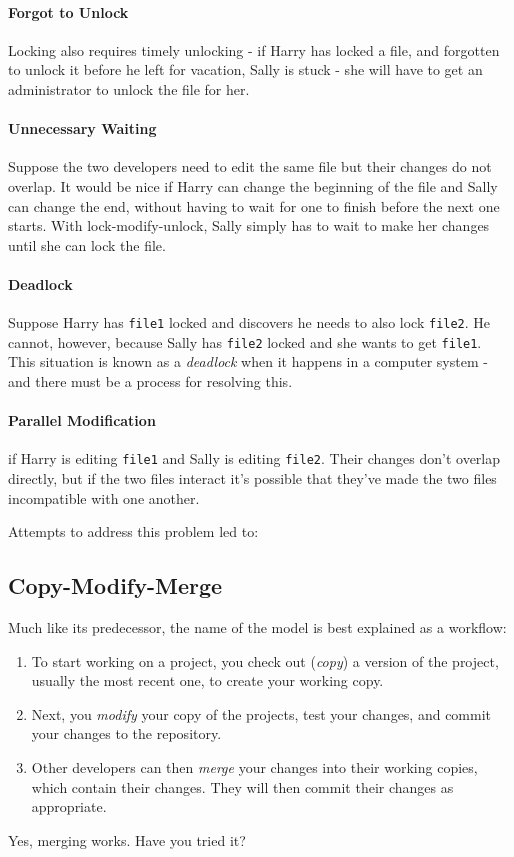\paragraph{Forgot to Unlock} Locking also requires timely unlocking - if Harry has locked a file, and forgotten to unlock it before he left for vacation, Sally is stuck - she will have to get an administrator to unlock the file for her.

\paragraph{Unnecessary Waiting} Suppose the two developers need to edit the same file but their changes do not overlap. It would be nice if Harry can change the beginning of the file and Sally can change the end, without having to wait for one to finish before the next one starts. With lock-modify-unlock, Sally simply has to wait to make her changes until she can lock the file.

\paragraph{Deadlock} Suppose Harry has \texttt{file1} locked and discovers he needs to also lock \texttt{file2}. He cannot, however, because Sally has \texttt{file2} locked and she wants to get \texttt{file1}. This situation is known as a \emph{deadlock} when it happens in a computer system - and there must be a process for resolving this.

\paragraph{Parallel Modification} if Harry is editing \texttt{file1} and Sally is editing \texttt{file2}. Their changes don't overlap directly, but if the two files interact it's possible that they've made the two files incompatible with one another.

Attempts to address this problem led to:

\subsection*{Copy-Modify-Merge}
Much like its predecessor, the name of the model is best explained as a workflow:

\begin{enumerate}
\item To start working on a project, you check out (\emph{copy}) a
  version of the project, usually the most recent one, to create your
  working copy.
\item Next, you \emph{modify} your copy of the projects, test your
  changes, and commit your changes to the repository.
\item Other developers can then \emph{merge} your changes into their
  working copies, which contain their changes. They will then commit
  their changes as appropriate.
\end{enumerate}
Yes, merging works. Have you tried it?

